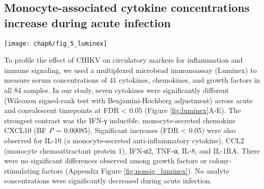 \subsection{Monocyte-associated cytokine concentrations increase during acute infection}

\begin{figure*}[htb]
  \centering
  \texttt{[image: chap6/fig\_5\_luminex]}
  \caption[Differences in serum cytokine and chemokine levels between the acute and convalescent phase samples]{
  \textbf{Differences in serum cytokine and chemokine levels between the acute and convalescent phase samples.} Wilcoxon signed-rank test was used to determine statistical significance, with a Benjamini-Hochberg adjustment for FDR (n = 41). *\emph{P} < 0.05, ***\emph{P} < 0.001. A, CXC chemokines. B, CC chemokines. C, interferons. D, TNF superfamily cytokines. E, interleukins. Note that IL-8 is both a CXC chemokine (CXCL8) and an interleukin, so it is depicted twice. Growth factors and colony-stimulating factors are shown in Appendix Figure \ref{fig:nonsig_luminex}.
  }
  \label{fig:luminex}
\end{figure*}

To profile the effect of CHIKV on circulatory markers for inflammation and immune signaling, we used a multiplexed microbead immunoassay (Luminex) to measure serum concentrations of 41 cytokines, chemokines, and growth factors in all 84 samples. In our study, seven cytokines were significantly different (Wilcoxon signed-rank test with Benjamini-Hochberg adjustment) across acute and convalescent timepoints at FDR < 0.05 (Figure \ref{fig:luminex}A-E). The strongest contrast was the IFN-γ inducible, monocyte-secreted chemokine CXCL10 (BF \emph{P} = 0.00085). Significant increases (FDR < 0.05) were also observed for IL-10 (a monocyte-secreted anti-inflammatory cytokine), CCL2 (monocyte chemoattractant protein 1), IFN-α2, TNF-α, IL-8, and IL-1RA. There were no significant differences observed among growth factors or colony-stimulating factors (Appendix Figure \ref{fig:nonsig_luminex}). No analyte concentrations were significantly decreased during acute infection.

